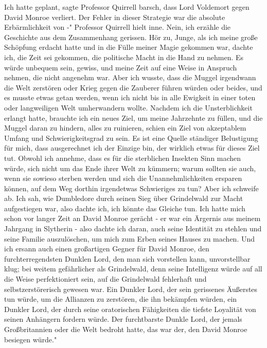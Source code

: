 \glqq{}Ich hatte geplant\grqq{}, sagte Professor Quirrell barsch, \glqq{}dass Lord
Voldemort gegen David Monroe verliert. Der Fehler in dieser Strategie war die
absolute Erbärmlichkeit von -" Professor Quirrell hielt inne. \glqq{}Nein, ich
erzähle die Geschichte aus dem Zusammenhang gerissen. Hör zu, Junge, als ich
meine große Schöpfung erdacht hatte und in die Fülle meiner Magie gekommen war,
dachte ich, die Zeit sei gekommen, die politische Macht in die Hand zu nehmen.
Es würde unbequem sein, gewiss, und meine Zeit auf eine Weise in Anspruch
nehmen, die nicht angenehm war. Aber ich wusste, dass die Muggel irgendwann die
Welt zerstören oder Krieg gegen die Zauberer führen würden oder beides, und es
musste etwas getan werden, wenn ich nicht bis in alle Ewigkeit in einer toten
oder langweiligen Welt umherwandern wollte. Nachdem ich die Unsterblichkeit
erlangt hatte, brauchte ich ein neues Ziel, um meine Jahrzehnte zu füllen, und
die Muggel daran zu hindern, alles zu ruinieren, schien ein Ziel von akzeptablem
Umfang und Schwierigkeitsgrad zu sein. Es ist eine Quelle ständiger Belustigung
für mich, dass ausgerechnet ich der Einzige bin, der wirklich etwas für dieses
Ziel tut. Obwohl ich annehme, dass es für die sterblichen Insekten Sinn machen
würde, sich nicht um das Ende ihrer Welt zu kümmern; warum sollten sie auch,
wenn sie sowieso sterben werden und sich die Unannehmlichkeiten ersparen können,
auf dem Weg dorthin irgendetwas Schwieriges zu tun? Aber ich schweife ab. Ich
sah, wie Dumbledore durch seinen Sieg über Grindelwald zur Macht aufgestiegen
war, also dachte ich, ich könnte das Gleiche tun. Ich hatte mich schon vor
langer Zeit an David Monroe gerächt - er war ein Ärgernis aus meinem Jahrgang in
Slytherin - also dachte ich daran, auch seine Identität zu stehlen und seine
Familie auszulöschen, um mich zum Erben seines Hauses zu machen. Und ich ersann
auch einen großartigen Gegner für David Monroe, den furchterregendsten Dunklen
Lord, den man sich vorstellen kann, unvorstellbar klug; bei weitem gefährlicher
als Grindelwald, denn seine Intelligenz würde auf all die Weise perfektioniert
sein, auf die Grindelwald fehlerhaft und selbstzerstörerisch gewesen war. Ein
Dunkler Lord, der sein gerissenes Äußerstes tun würde, um die Allianzen zu
zerstören, die ihn bekämpfen würden, ein Dunkler Lord, der durch seine
oratorischen Fähigkeiten die tiefste Loyalität von seinen Anhängern fordern
würde. Der furchtbarste Dunkle Lord, der jemals Großbritannien oder die Welt
bedroht hatte, das war der, den David Monroe besiegen würde."

